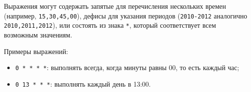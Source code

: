 \documentclass[listings]{labreport}
\begin{document}
Выражения могут содержать запятые для перечисления нескольких времен (например, \texttt{15,30,45,00}), дефисы для указания
периодов (\texttt{2010-2012} аналогично \texttt{2010,2011,2012}), или состоять из знака \texttt{*}, который соответствует
всем возможным значениям.

Примеры выражений:
\begin{itemize}
\item \texttt{0 * * * *}: выполнять всегда, когда минуты равны 00, то есть каждый час;
\item \texttt{0 13 * * *}: выполнять каждый день в 13:00.
\end{itemize}
\end{document}
